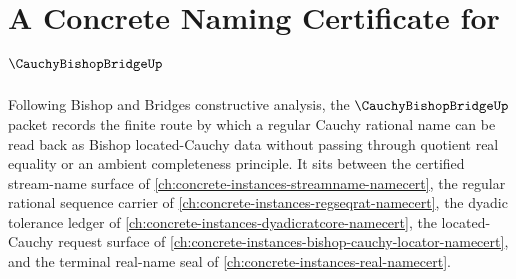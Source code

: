 \chapter{A Concrete Naming Certificate for $\CauchyBishopBridgeUp$}
\label{ch:concrete-instances-cauchy-bishop-bridge-namecert}

Following Bishop and Bridges constructive analysis, the $\CauchyBishopBridgeUp$ packet records the finite route by which a regular Cauchy rational name can be read back as Bishop located-Cauchy data without passing through quotient real equality or an ambient completeness principle. It sits between the certified stream-name surface of \autoref{ch:concrete-instances-streamname-namecert}, the regular rational sequence carrier of \autoref{ch:concrete-instances-regseqrat-namecert}, the dyadic tolerance ledger of \autoref{ch:concrete-instances-dyadicratcore-namecert}, the located-Cauchy request surface of \autoref{ch:concrete-instances-bishop-cauchy-locator-namecert}, and the terminal real-name seal of \autoref{ch:concrete-instances-real-namecert}.

